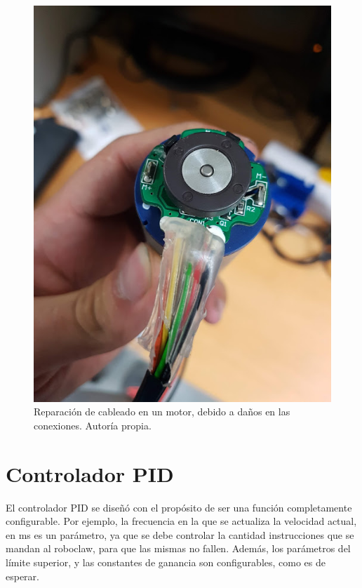 \begin{figure}[h!]
\centering
\includegraphics[scale=0.6]{imagenes/cablesmalos.jpg}
\caption{Reparación de cableado en un motor, debido a daños en las conexiones. Autoría propia. }
\label{F:cables}
\end{figure}

\newpage

\section{Controlador PID}

El controlador PID se diseñó con el propósito de ser una función completamente configurable. Por ejemplo, la frecuencia en la que se actualiza la velocidad actual, en ms es un parámetro, ya que se debe controlar la cantidad instrucciones que se mandan al roboclaw, para que las mismas no fallen. Además, los parámetros del límite superior, y las constantes de ganancia son configurables, como es de esperar.

